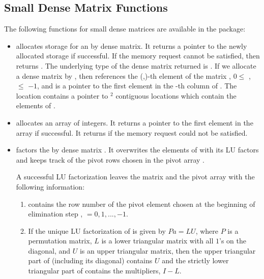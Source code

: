 \subsection{Small Dense Matrix Functions}
The following functions for small dense matrices are available in the
{\dense} package:
%
\begin{itemize}

\item {}
  \par {} allocates storage for an   by  dense matrix. 
  It returns a pointer to the newly allocated storage if            
  successful. If the memory request cannot be satisfied, then    
   returns . The underlying type of the dense matrix 
  returned is . If we allocate a dense matrix  by 
  , then  references the (,)-th element   
  of the matrix , $0 \le$ ,  $\le$ $-1$, and  
  is a pointer to the first element in the -th column of . 
  The location  contains a pointer to $^2$ contiguous locations which contain   
  the elements of .

\item {}
  \par {} allocates an array of  integers. 
  It returns a pointer to the first element in the array if successful. 
  It returns  if the memory request could not be satisfied.

\item {}
  \par {} factors the  by  dense matrix . 
  It overwrites the elements of  with its LU factors and keeps track of the
  pivot rows chosen in the pivot array .

  A successful LU factorization leaves the matrix  and the      
  pivot array  with the following information:                  
  \begin{enumerate}
  \item 
     contains the row number of the pivot element chosen   
    at the beginning of elimination step ,  $ = 0, 1, ..., $$-1$.  
                                                                 
  \item 
    If the unique LU factorization of  is given by $Pa = LU$,   
    where $P$ is a permutation matrix, $L$ is a lower triangular   
    matrix with all $1$'s on the diagonal, and $U$ is an upper     
    triangular matrix, then the upper triangular part of      
    (including its diagonal) contains $U$ and the strictly lower 
    triangular part of  contains the multipliers, $I-L$. 
                                                                  

\end{enumerate}
\end{itemize}
